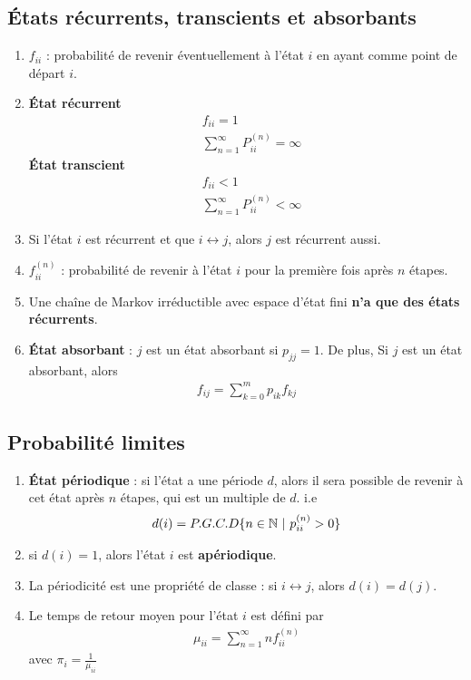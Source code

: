 \documentclass[10pt, french, landscape]{article}
\begin{document}
\begin{multicols*}{2}
\subsection*{États récurrents, transcients et absorbants}
\begin{enumerate}[label=\faAngleRight]
\item $f_{ii}$ : probabilité de revenir éventuellement à l'état $i$ en ayant comme point de départ $i$.
\item 
\begin{multicols*}{2}
\textbf{État récurrent} 
\begin{align*}
&	f_{ii} = 1 \\
&	\sum_{n = 1}^{\infty} P_{ii}^{(n)} = \infty 
\end{align*}
\newpage
\textbf{État transcient}
\begin{align*}
&	f_{ii} < 1 \\
&	\sum_{n = 1}^{\infty} P_{ii}^{(n)} < \infty 
\end{align*}
\end{multicols*}
\item Si l'état $i$ est récurrent et que $i \leftrightarrow j$, alors $j$ est récurrent aussi.
\item $f_{ii}^{(n)}$ : probabilité de revenir à l'état $i$ pour la première fois après $n$ étapes.
\item Une chaîne de Markov irréductible avec espace d'état fini \textbf{n'a que des états récurrents}.
\item \textbf{État absorbant} : $j$ est un état absorbant si $p_{jj} = 1$. De plus, Si $j$ est un état absorbant, alors
\begin{align*}
f_{ij} = \sum_{k=0}^{m} p_{ik} f_{kj}
\end{align*}
\end{enumerate}

\subsection*{Probabilité limites}
\begin{enumerate}[label=\faAngleRight]
\item \textbf{État périodique} : si l'état a une période $d$, alors il sera possible de revenir à cet état après $n$ étapes, qui est un multiple de $d$. i.e
\begin{align*}
d(i) = P.G.C.D\{n \in \mathbb{N} ~ | ~ p_{ii}^{(n)} > 0 \}
\end{align*}
\item si $d(i)=1$, alors l'état $i$ est \textbf{apériodique}.
\item La périodicité est une propriété de classe : si $i \leftrightarrow j$, alors $d(i) = d(j)$.
\item Le temps de retour moyen pour l'état $i$ est défini par
\begin{align*}
\mu_{ii} = \sum_{n=1}^{\infty} n f_{ii}^{(n)}
\end{align*}
avec $\pi_i = \frac{1}{\mu_{ii}}$


\end{enumerate}
\end{multicols*}
\end{document}

